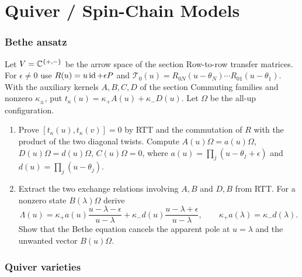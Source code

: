 \part{Quiver / Spin-Chain Models}

\section{Bethe ansatz}

\begin{exercise}
Let $V=\mathbb C^{\{+,-\}}$ be the arrow space of the section
Row-to-row transfer matrices. For $\epsilon\ne0$ use
$R(u)=u\operatorname{id}+\epsilon P$ and
$\mathcal T_0(u)=R_{0N}(u-\theta_N)\cdots R_{01}(u-\theta_1)$.
With the auxiliary kernels $A,B,C,D$ of the section Commuting
families and nonzero $\kappa_\pm$, put
$t_\kappa(u)=\kappa_+A(u)+\kappa_-D(u)$.
Let $\Omega$ be the all-up configuration.
\begin{enumerate}[label=(\alph*)]
\item Prove $[t_\kappa(u),t_\kappa(v)]=0$ by RTT and the
commutation of $R$ with the product of the two diagonal twists.
Compute
$A(u)\Omega=a(u)\Omega$, $D(u)\Omega=d(u)\Omega$, $C(u)\Omega=0$,
where $a(u)=\prod_j(u-\theta_j+\epsilon)$ and
$d(u)=\prod_j(u-\theta_j)$.
\item Extract the two exchange relations involving $A,B$ and
$D,B$ from RTT. For a nonzero state $B(\lambda)\Omega$ derive
\[
 \Lambda(u)=\kappa_+a(u)\frac{u-\lambda-\epsilon}{u-\lambda}
          +\kappa_-d(u)\frac{u-\lambda+\epsilon}{u-\lambda},
 \qquad
 \kappa_+a(\lambda)=\kappa_-d(\lambda).
\]
Show that the Bethe equation cancels the apparent pole at
$u=\lambda$ and the unwanted vector $B(u)\Omega$.
\end{enumerate}
\end{exercise}

\section{Quiver varieties}


